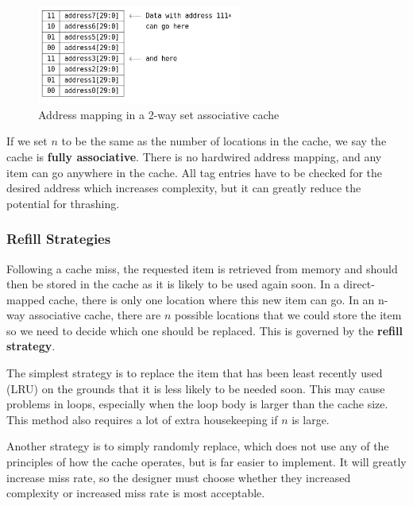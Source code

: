 \documentclass{article}
\begin{document}
	\begin{figure}[ht]
		\centering
		\includegraphics[width=0.6\textwidth]{n_way_associative_cache}
		\caption{Address mapping in a 2-way set associative cache}
		\label{fig:n way associative cache}
	\end{figure}
	
	If we set $n$ to be the same as the number of locations in the cache, we say the cache is \textbf{fully associative}. There is no hardwired address mapping, and any item can go anywhere in the cache. All tag entries have to be checked for the desired address which increases complexity, but it can greatly reduce the potential for thrashing.
	
	\subsubsection{Refill Strategies}
	Following a cache miss, the requested item is retrieved from memory and should then be stored in the cache as it is likely to be used again soon. In a direct-mapped cache, there is only one location where this new item can go. In an n-way associative cache, there are $n$ possible locations that we could store the item so we need to decide which one should be replaced. This is governed by the \textbf{refill strategy}. 
	
	\par 
	The simplest strategy is to replace the item that has been least recently used (LRU) on the grounds that it is less likely to be needed soon. This may cause problems in loops, especially when the loop body is larger than the cache size. This method also requires a lot of extra housekeeping if $n$ is large. 
	
	\par 
	Another strategy is to simply randomly replace, which does not use any of the principles of how the cache operates, but is far easier to implement. It will greatly increase miss rate, so the designer must choose whether they increased complexity or increased miss rate is most acceptable.
	
\end{document}
